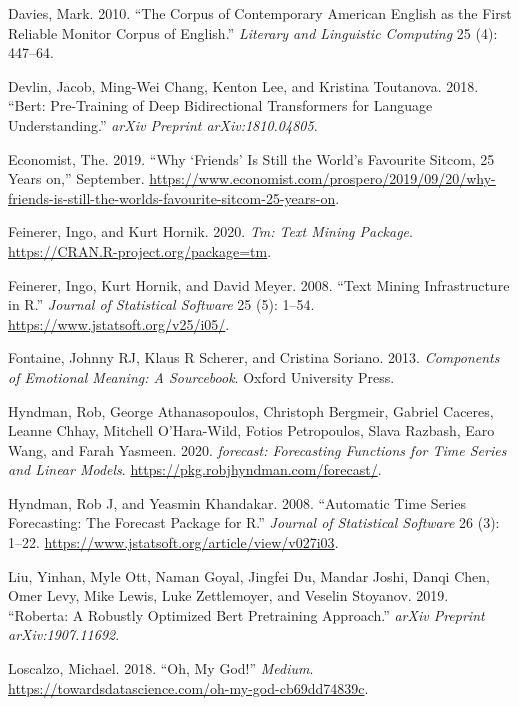 \documentclass[]{article}
\begin{document}
\leavevmode\hypertarget{ref-davies2010corpus}{}%
Davies, Mark. 2010. ``The Corpus of Contemporary American English as the First Reliable Monitor Corpus of English.'' \emph{Literary and Linguistic Computing} 25 (4): 447--64.

\leavevmode\hypertarget{ref-devlin2018bert}{}%
Devlin, Jacob, Ming-Wei Chang, Kenton Lee, and Kristina Toutanova. 2018. ``Bert: Pre-Training of Deep Bidirectional Transformers for Language Understanding.'' \emph{arXiv Preprint arXiv:1810.04805}.

\leavevmode\hypertarget{ref-TheEconomist_2019}{}%
Economist, The. 2019. ``Why `Friends' Is Still the World's Favourite Sitcom, 25 Years on,'' September. \url{https://www.economist.com/prospero/2019/09/20/why-friends-is-still-the-worlds-favourite-sitcom-25-years-on}.

\leavevmode\hypertarget{ref-tm1}{}%
Feinerer, Ingo, and Kurt Hornik. 2020. \emph{Tm: Text Mining Package}. \url{https://CRAN.R-project.org/package=tm}.

\leavevmode\hypertarget{ref-tm2}{}%
Feinerer, Ingo, Kurt Hornik, and David Meyer. 2008. ``Text Mining Infrastructure in R.'' \emph{Journal of Statistical Software} 25 (5): 1--54. \url{https://www.jstatsoft.org/v25/i05/}.

\leavevmode\hypertarget{ref-fontaine2013components}{}%
Fontaine, Johnny RJ, Klaus R Scherer, and Cristina Soriano. 2013. \emph{Components of Emotional Meaning: A Sourcebook}. Oxford University Press.

\leavevmode\hypertarget{ref-forecast1}{}%
Hyndman, Rob, George Athanasopoulos, Christoph Bergmeir, Gabriel Caceres, Leanne Chhay, Mitchell O'Hara-Wild, Fotios Petropoulos, Slava Razbash, Earo Wang, and Farah Yasmeen. 2020. \emph{forecast: Forecasting Functions for Time Series and Linear Models}. \url{https://pkg.robjhyndman.com/forecast/}.

\leavevmode\hypertarget{ref-forecast2}{}%
Hyndman, Rob J, and Yeasmin Khandakar. 2008. ``Automatic Time Series Forecasting: The Forecast Package for R.'' \emph{Journal of Statistical Software} 26 (3): 1--22. \url{https://www.jstatsoft.org/article/view/v027i03}.

\leavevmode\hypertarget{ref-liu2019roberta}{}%
Liu, Yinhan, Myle Ott, Naman Goyal, Jingfei Du, Mandar Joshi, Danqi Chen, Omer Levy, Mike Lewis, Luke Zettlemoyer, and Veselin Stoyanov. 2019. ``Roberta: A Robustly Optimized Bert Pretraining Approach.'' \emph{arXiv Preprint arXiv:1907.11692}.

\leavevmode\hypertarget{ref-loscalzo_2018}{}%
Loscalzo, Michael. 2018. ``Oh, My God!'' \emph{Medium}. \url{https://towardsdatascience.com/oh-my-god-cb69dd74839c}.
\end{document}
